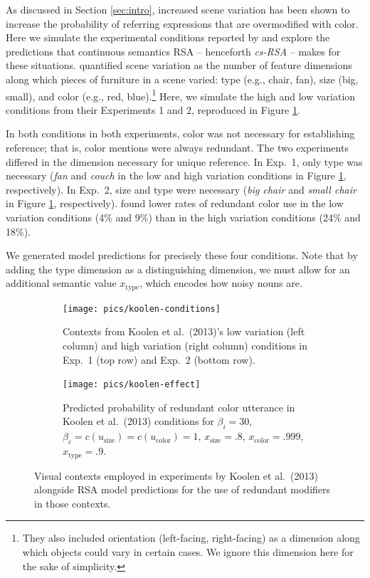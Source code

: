 \documentclass[11pt]{article}
\newcommand{\figref}[1]{Figure \ref{#1}}
\newcommand{\sectionref}[1]{Section \ref{#1}}
\begin{document}
As discussed in \sectionref{sec:intro}, increased scene variation has been shown to increase the probability of referring expressions that are overmodified with color. Here we simulate the experimental conditions reported by  and explore the predictions that continuous semantics RSA  -- henceforth \emph{cs-RSA} -- makes for these situations.   quantified scene variation as the number of feature dimensions along which pieces of furniture in a scene varied: type (e.g., chair, fan), size (big, small), and color (e.g., red, blue).\footnote{They also included orientation (left-facing, right-facing) as a dimension along which objects could vary in certain cases. We ignore this dimension here for the sake of simplicity.} Here, we  simulate the high and low variation conditions from their Experiments 1 and 2, reproduced in \figref{fig:koolencontexts}. 

In both conditions in both experiments, color was not necessary for establishing reference; that is, color mentions were always redundant. The two experiments differed in the dimension necessary for unique reference. In Exp.~1, only type was necessary (\emph{fan} and \emph{couch} in the low and high variation conditions in \figref{fig:koolencontexts}, respectively). In Exp.~2, size and type were necessary (\emph{big chair} and \emph{small chair} in \figref{fig:koolencontexts}, respectively).  found lower rates of redundant color use in the low variation conditions (4\% and 9\%) than in the high variation conditions (24\% and 18\%).

We generated model predictions for precisely these four conditions. Note that by adding the type dimension as a distinguishing dimension, we must allow for an additional semantic value $x_{\text{type}}$, which encodes how noisy nouns are.

\begin{figure}
\begin{subfigure}{.5\textwidth}
\texttt{[image: pics/koolen-conditions]}
\caption{Contexts from Koolen et al.~(2013)'s low variation (left column) and high variation (right column) conditions in Exp.~1 (top row) and Exp.~2 (bottom row).}
\label{fig:koolencontexts}
\end{subfigure}
\begin{subfigure}{.5\textwidth}
\centering
\texttt{[image: pics/koolen-effect]}
\caption{Predicted probability of redundant color utterance in Koolen et al.~(2013) conditions for $\beta_i = 30$, $ \beta_c = c(u_{\textrm{size}}) = c(u_{\textrm{color}}) = 1$, $x_{\text{size}} = .8$, $x_{\text{color}} = .999$, $x_{\text{type}} = .9$.}
\label{fig:koolensimulationresults}
\end{subfigure}
\caption{Visual contexts employed in experiments by Koolen et al.~(2013) alongside RSA model predictions for the use of redundant modifiers in those contexts.}
\end{figure}
\end{document}
